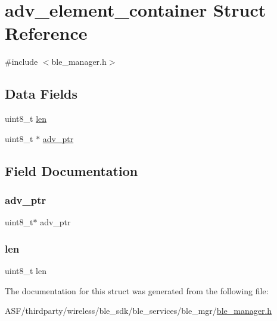 \hypertarget{structadv__element__container}{}\section{adv\+\_\+element\+\_\+container Struct Reference}
\label{structadv__element__container}


{\ttfamily \#include $<$ble\+\_\+manager.\+h$>$}

\subsection*{Data Fields}
\begin{DoxyCompactItemize}
\item 
uint8\+\_\+t \mbox{\hyperlink{structadv__element__container_a5723e60ffd628510c699eddbce90be23}{len}}
\item 
uint8\+\_\+t $\ast$ \mbox{\hyperlink{structadv__element__container_a6a6e1eea0f048851507266bdbc93e771}{adv\+\_\+ptr}}
\end{DoxyCompactItemize}


\subsection{Field Documentation}
\mbox{\label{structadv__element__container_a6a6e1eea0f048851507266bdbc93e771}} 
\subsubsection{\texorpdfstring{adv\_ptr}{adv\_ptr}}
{\footnotesize\ttfamily uint8\+\_\+t$\ast$ adv\+\_\+ptr}

\mbox{\label{structadv__element__container_a5723e60ffd628510c699eddbce90be23}} 
\subsubsection{\texorpdfstring{len}{len}}
{\footnotesize\ttfamily uint8\+\_\+t len}



The documentation for this struct was generated from the following file\+:\begin{DoxyCompactItemize}
\item 
A\+S\+F/thirdparty/wireless/ble\+\_\+sdk/ble\+\_\+services/ble\+\_\+mgr/\mbox{\hyperlink{ble__manager_8h}{ble\+\_\+manager.\+h}}\end{DoxyCompactItemize}
